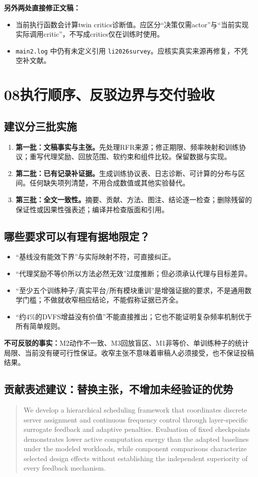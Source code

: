\documentclass[UTF8,11pt,a4paper,fontset=fandol]{ctexart}
\newenvironment{draft}{\begin{quote}\small\setlength{\parskip}{4pt}}{\end{quote}}
\newcommand{\partpage}[2]{\section*{#1\quad #2}}
\newcommand{\code}[1]{\nolinkurl{#1}}
\begin{document}
\textbf{另外两处直接修正文稿：}
\begin{itemize}
\item 当前执行函数会计算twin critics诊断值。应区分“决策仅需actor”与“当前实现实际调用critic”，不写成critics仅在训练时使用。
\item \code{main2.log} 中仍有未定义引用 \code{li2026survey}。应核实真实来源再修复，不凭空补文献。
\end{itemize}

\newpage
\partpage{08}{执行顺序、反驳边界与交付验收}
\subsection*{建议分三批实施}
\begin{enumerate}
\item \textbf{第一批：文稿事实与主张。}先处理RFR来源；修正期限、频率映射和训练协议；重写代理奖励、回放范围、软约束和组件比较。保留数据与实现。
\item \textbf{第二批：已有记录补证据。}生成训练协议表、日志诊断、可计算的分布与区间。任何缺失项列清楚，不用合成数值或其他实验替代。
\item \textbf{第三批：全文一致性。}摘要、贡献、方法、图注、结论逐一检查；删除残留的保证性或因果性强表述；编译并检查版面和引用。
\end{enumerate}

\subsection*{哪些要求可以有理有据地限定？}
\begin{itemize}
\item “基线没有能效下界”与实际映射不符，可直接纠正。
\item “代理奖励不等价所以方法必然无效”过度推断；但必须承认代理与目标差异。
\item “至少五个训练种子/真实平台/所有模块重训”是增强证据的要求，不是通用数学门槛；不做就收窄相应结论，不能假称证据已齐全。
\item “约4\%的DVFS增益没有价值”不能直接推出；它也不能证明复杂频率机制优于所有简单规则。
\end{itemize}

\textbf{不可反驳的事实：}M2动作不一致、M3回放盲区、M1非等价、单训练种子的统计局限、当前没有硬可行性保证。收窄主张不意味着审稿人必须接受，也不保证投稿结果。

\subsection*{贡献表述建议：替换主张，不增加未经验证的优势}
\begin{draft}
We develop a hierarchical scheduling framework that coordinates discrete server assignment and continuous frequency control through layer-specific surrogate feedback and adaptive penalties. Evaluation of fixed checkpoints demonstrates lower active computation energy than the adapted baselines under the modeled workloads, while component comparisons characterize selected design effects without establishing the independent superiority of every feedback mechanism.
\end{draft}
\end{document}
